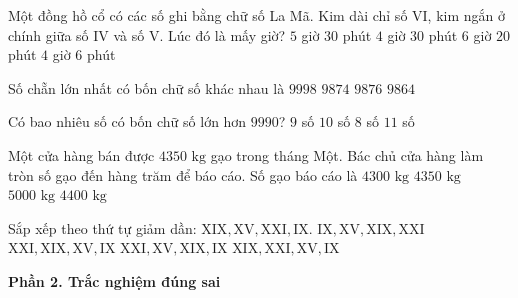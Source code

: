 \begin{ex} %
Một đồng hồ cổ có các số ghi bằng chữ số La Mã. Kim dài chỉ số $\text{VI}$, kim ngắn ở chính giữa số $\text{IV}$ và số $\text{V}$. Lúc đó là mấy giờ?
\choice
{$5$ giờ $30$ phút}
{\True $4$ giờ $30$ phút}
{$6$ giờ $20$ phút}
{$4$ giờ $6$ phút}
\end{ex}

\begin{ex} %
Số chẵn lớn nhất có bốn chữ số khác nhau là
\choice
{$9998$}
{$9874$}
{\True $9876$}
{$9864$}
\end{ex}

\begin{ex} %
Có bao nhiêu số có bốn chữ số lớn hơn $9990$?
\choice
{\True $9$ số}
{$10$ số}
{$8$ số}
{$11$ số}
\end{ex}

\begin{ex} %
Một cửa hàng bán được $4350\text{ kg}$ gạo trong tháng Một. Bác chủ cửa hàng làm tròn số gạo đến hàng trăm để báo cáo. Số gạo báo cáo là
\choice
{$4300\text{ kg}$}
{$4350\text{ kg}$}
{$5000\text{ kg}$}
{\True $4400\text{ kg}$}
\end{ex}

\begin{ex} %
Sắp xếp theo thứ tự giảm dần: $\text{XIX}, \text{XV}, \text{XXI}, \text{IX}$.
\choice
{$\text{IX}, \text{XV}, \text{XIX}, \text{XXI}$}
{\True $\text{XXI}, \text{XIX}, \text{XV}, \text{IX}$}
{$\text{XXI}, \text{XV}, \text{XIX}, \text{IX}$}
{$\text{XIX}, \text{XXI}, \text{XV}, \text{IX}$}
\end{ex}

\textbf{Phần 2. Trắc nghiệm đúng sai}


